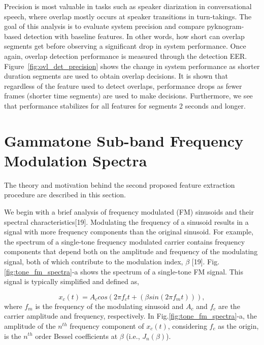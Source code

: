 {Precision is most valuable in tasks such as speaker diarization in conversational speech, where overlap mostly occurs at speaker transitions in turn-takings. 
The goal of this analysis is to evaluate system precision and compare pyknogram-based detection with baseline features. 
In other words, how short can overlap segments get before observing a significant drop in system performance. 
Once again, overlap detection performance is measured through the detection EER. 
Figure~\ref{fig:ovl_det_precision} shows the change in system performance as shorter duration segments are used to obtain overlap decisions. 
It is shown that regardless of the feature used to detect overlaps, performance drops as fewer frames (shorter time segments) are used to make decisions. 
Furthermore, we see that performance stabilizes for all features for segments 2 seconds and longer. 




\section{Gammatone Sub-band Frequency Modulation Spectra}
\label{sec:GSFM}

The theory and motivation behind the second proposed feature extraction procedure are described in this section. 

We begin with a brief analysis of frequency modulated (FM) sinusoids and their spectral characteristics[19]. 
Modulating the frequency of a sinusoid results in a signal with more frequency components than the original sinusoid. 
For example, the spectrum of a single-tone frequency modulated carrier contains frequency components that depend both on the amplitude and frequency of the modulating signal, both of which contribute to the modulation index, $\beta$ [19]. 
Fig.\ref{fig:tone_fm_spectra}-a shows the spectrum of a single-tone FM signal. 
This signal is typically simplified and defined as, 

\begin{equation}
\label{eq:1sin_fm}
x_c(t) = A_ccos(2\pi f_ct+(\beta sin(2\pi f_mt))),
\end{equation}
where $f_m$ is the frequency of the modulating sinusoid and $A_c$ and $f_c$ are the carrier amplitude and frequency, respectively. 
In Fig.\ref{fig:tone_fm_spectra}-a, the amplitude of the $n^{th}$ frequency component of $x_c(t)$, considering $f_c$ as the origin, is the $n^{th}$ order Bessel coefficients at $\beta$ (i.e., $J_n(\beta)$). 

}
